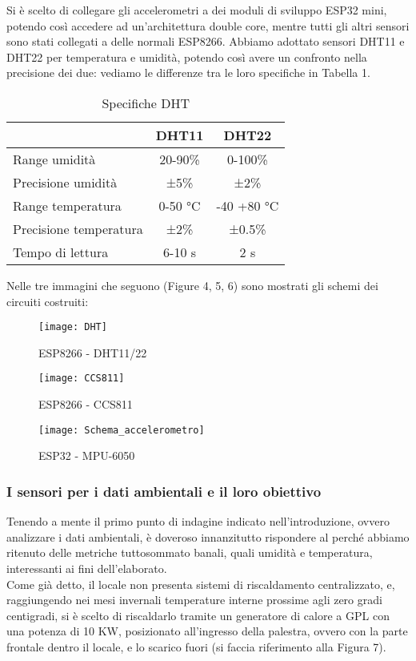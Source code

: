\documentclass[fleqn,10pt]{SelfArx} %
\begin{document}
Si è scelto di collegare gli accelerometri a dei moduli di sviluppo ESP32 mini, potendo così accedere ad 
un'architettura double core, mentre tutti gli altri sensori sono stati collegati a delle normali ESP8266. 
Abbiamo adottato sensori DHT11 e DHT22 per temperatura e umidità, potendo così avere un confronto nella 
precisione dei due: vediamo le differenze tra le loro specifiche in Tabella 1.

\begin{table}[hbt]
	\caption{Specifiche DHT}
	\centering
	\begin{tabular}{lcc}
		\toprule
			 & \textbf{DHT11} & \textbf{DHT22} \\
		\midrule
		Range umidità & 20-90\% & 0-100\% \\
		Precisione umidità & ±5\% & ±2\% \\
		Range temperatura & 0-50 °C & -40 +80 °C \\
		Precisione temperatura & ±2\% & ±0.5\% \\
		Tempo di lettura & 6-10 s & 2 s \\
		\bottomrule
	\end{tabular}
	\label{tab:label}
\end{table}

Nelle tre immagini che seguono (Figure 4, 5, 6) sono mostrati gli schemi dei circuiti costruiti: 

\begin{figure}[htb!]\centering
	\texttt{[image: DHT]}
	\caption{ESP8266 - DHT11/22}
	\label{fig:DHT11/22}
\end{figure}

\begin{figure}[htb!]\centering
	\texttt{[image: CCS811]}
	\caption{ESP8266 - CCS811}
	\label{fig:CCS811}
\end{figure}

\begin{figure}[htb!]\centering
	\texttt{[image: Schema\_accelerometro]}
	\caption{ESP32 - MPU-6050}
	\label{fig:MPU-6050}
\end{figure}

\subsubsection{I sensori per i dati ambientali e il loro obiettivo}
Tenendo a mente il primo punto di indagine indicato nell'introduzione, ovvero analizzare i dati ambientali, è doveroso 
innanzitutto rispondere al perché abbiamo ritenuto delle metriche tuttosommato banali, 
quali umidità e temperatura, interessanti ai fini dell'elaborato.\\
Come già detto, il locale non presenta sistemi di riscaldamento centralizzato, e, raggiungendo nei mesi invernali 
temperature interne prossime agli zero gradi centigradi, si è scelto di riscaldarlo tramite un generatore di calore a 
GPL con una potenza di 10 KW, posizionato all'ingresso della palestra, ovvero con la parte frontale dentro il locale, 
e lo scarico fuori (si faccia riferimento alla Figura 7).\\
\end{document}
